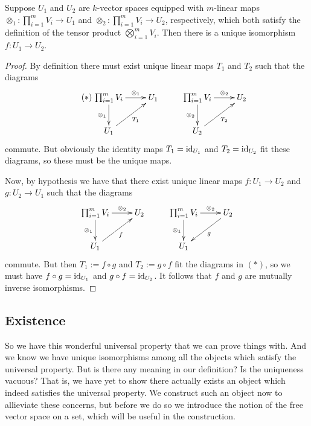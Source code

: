 \begin{pro} \label{tenunique} Suppose $U_1$ and $U_2$ are $k$-vector
  spaces equipped with $m$-linear maps $\otimes_1: \prod_{i=1}^m V_i
  \to U_1$ and $\otimes_2: \prod_{i=1}^m V_i \to U_2$, respectively,
  which both satisfy the definition of the tensor product
  $\bigotimes_{i=1}^m V_i$. Then there is a unique isomorphism $f: U_1
  \to U_2$.
  \begin{proof}
    By definition there must exist unique linear maps $T_1$ and $T_2$
    such that the diagrams
    \begin{equation} \tag{$*$} \xymatrix{ \prod_{i=1}^m V_i
        \ar[r]^-{\otimes_1} \ar[d]_-{\otimes_1} & U_1 & \prod_{i=1}^m
        V_i \ar[r]^-{\otimes_2} \ar[d]_-{\otimes_2} & U_2 \\ U_1
        \ar[ur]_-{T_1} & & U_2 \ar[ur]_-{T_2} } \end{equation}
    commute. But obviously the identity maps $T_1 = \operatorname{id}_{U_1}$ and
    $T_2 = \operatorname{id}_{U_2}$ fit these diagrams, so these must be the unique
    maps.

    Now, by hypothesis we have that there exist unique linear maps $f:
    U_1 \to U_2$ and $g: U_2 \to U_1$ such that the diagrams
    \[ \xymatrix{ \prod_{i=1}^m V_i \ar[r]^-{\otimes_2}
      \ar[d]_-{\otimes_1} & U_2 & \prod_{i=1}^m V_i
      \ar[r]^-{\otimes_2} \ar[d]_-{\otimes_1} & U_2 \ar[dl]^-{g} \\
      U_1 \ar[ur]_-{f} & & U_1 } \] commute. But then $T_1 := f \circ
    g$ and $T_2 := g \circ f$ fit the diagrams in $(*)$, so we must
    have $f \circ g = \operatorname{id}_{U_1}$ and $g \circ f = \operatorname{id}_{U_2}$. It
    follows that $f$ and $g$ are mutually inverse isomorphisms.
  \end{proof}
\end{pro}

\subsection{Existence}

So we have this wonderful universal property that we can prove things
with. And we know we have unique isomorphisms among all the objects
which satisfy the universal property. But is there any meaning in our
definition? Is the uniqueness vacuous? That is, we have yet to show
there actually exists an object which indeed satisfies the universal
property. We construct such an object now to allieviate these
concerns, but before we do so we introduce the notion of the free
vector space on a set, which will be useful in the construction.


